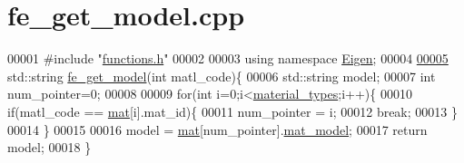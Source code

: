 \hypertarget{fe__get__model_8cpp_source}{}\section{fe\+\_\+get\+\_\+model.\+cpp}
\label{fe__get__model_8cpp_source}

\begin{DoxyCode}
00001 \textcolor{preprocessor}{#include "\hyperlink{functions_8h}{functions.h}"}
00002 
00003 \textcolor{keyword}{using namespace }\hyperlink{namespace_eigen}{Eigen};
00004 
\hyperlink{fe__get__model_8cpp_a34d6fb85943d945b7e8600d2ef4220d0}{00005} std::string \hyperlink{fe__get__model_8cpp_a34d6fb85943d945b7e8600d2ef4220d0}{fe\_get\_model}(\textcolor{keywordtype}{int} matl\_code)\{
00006     std::string model;
00007     \textcolor{keywordtype}{int} num\_pointer=0;
00008 
00009     \textcolor{keywordflow}{for}(\textcolor{keywordtype}{int} i=0;i<\hyperlink{_global_variables_8h_a39328cf72d69139b3b6c5b8ef6c636fe}{material\_types};i++)\{
00010         \textcolor{keywordflow}{if}(matl\_code == \hyperlink{_global_variables_8h_acfa6799b35f9301b5fc44e6043624797}{mat}[i].mat\_id)\{
00011             num\_pointer = i;
00012             \textcolor{keywordflow}{break};
00013         \}
00014     \}
00015 
00016     model = \hyperlink{_global_variables_8h_acfa6799b35f9301b5fc44e6043624797}{mat}[num\_pointer].\hyperlink{class_materials_abe8d649257d71769de7a3aa20ff8977e}{mat\_model};
00017     \textcolor{keywordflow}{return} model;
00018 \}
\end{DoxyCode}
